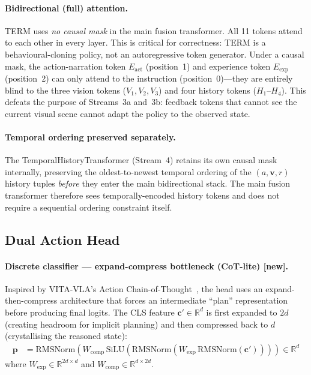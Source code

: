 \documentclass{article}
\newcommand{\NEW}{\textcolor{NewOrange}{\textbf{[new]}}\xspace}
\begin{document}
\paragraph{Bidirectional (full) attention.}
TERM uses \emph{no causal mask} in the main fusion transformer.
All 11 tokens attend to each other in every layer.
This is critical for correctness: TERM is a behavioural-cloning policy, not
an autoregressive token generator.
Under a causal mask, the action-narration token $E_{\mathrm{act}}$ (position~1) and
experience token $E_{\mathrm{exp}}$ (position~2) can only attend to the instruction
(position~0)---they are entirely blind to the three vision tokens ($V_1, V_2, V_3$)
and four history tokens ($H_1$--$H_4$).
This defeats the purpose of Streams~3a and~3b: feedback tokens that cannot
see the current visual scene cannot adapt the policy to the observed state.

\paragraph{Temporal ordering preserved separately.}
The TemporalHistoryTransformer (Stream~4) retains its own causal mask
internally, preserving the oldest-to-newest temporal ordering of the
$(a, \mathbf{v}, r)$ history tuples \emph{before} they enter the main
bidirectional stack.
The main fusion transformer therefore sees temporally-encoded history tokens
and does not require a sequential ordering constraint itself.

\subsection{Dual Action Head}

\paragraph{Discrete classifier — expand-compress bottleneck (CoT-lite) \NEW.}
Inspired by VITA-VLA's Action Chain-of-Thought~\citep{vitavla2024},
the head uses an expand-then-compress architecture that forces an
intermediate ``plan'' representation before producing final logits.
The CLS feature $\mathbf{c}'\!\in\!\mathbb{R}^d$ is first expanded to $2d$
(creating headroom for implicit planning) and then compressed back to $d$
(crystallising the reasoned state):
\begin{align}
  \mathbf{p} &= \mathrm{RMSNorm}\!\left(
    W_{\mathrm{comp}}\,\mathrm{SiLU}\!\left(
      \mathrm{RMSNorm}\!\left(
        W_{\mathrm{exp}}\,\mathrm{RMSNorm}(\mathbf{c}')
      \right)
    \right)
  \right) \in\mathbb{R}^d
  \label{eq:bottleneck}
\end{align}
where $W_{\mathrm{exp}}\!\in\!\mathbb{R}^{2d\times d}$ and
$W_{\mathrm{comp}}\!\in\!\mathbb{R}^{d\times 2d}$.
\end{document}
